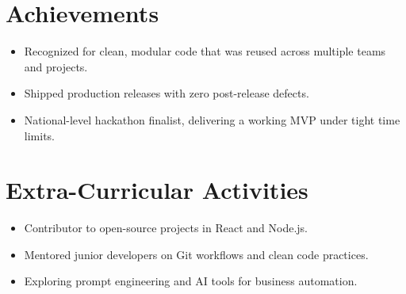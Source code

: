\documentclass[a4paper,11pt]{article}
\begin{document}
\section*{Achievements}
\begin{itemize}
  \item Recognized for clean, modular code that was reused across multiple teams and projects.
  \item Shipped production releases with zero post-release defects.
  \item National-level hackathon finalist, delivering a working MVP under tight time limits.
\end{itemize}

\section*{Extra-Curricular Activities}
\begin{itemize}
  \item Contributor to open-source projects in React and Node.js.
  \item Mentored junior developers on Git workflows and clean code practices.
  \item Exploring prompt engineering and AI tools for business automation.
\end{itemize}
\end{document}
